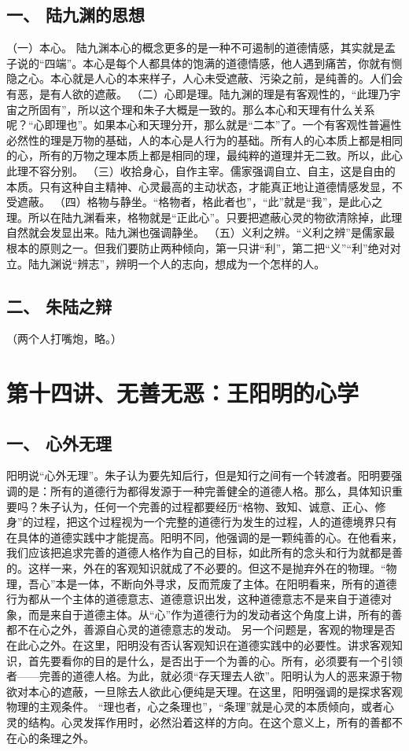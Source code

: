 \documentclass{article}
\begin{document}
\subsection{一、	陆九渊的思想}
（一）本心。 陆九渊本心的概念更多的是一种不可遏制的道德情感，其实就是孟子说的“四端”。本心是每个人都具体的饱满的道德情感，他人遇到痛苦，你就有恻隐之心。本心就是人心的本来样子，人心未受遮蔽、污染之前，是纯善的。人们会有恶，是有人欲的遮蔽。
（二）心即是理。陆九渊的理是有客观性的，“此理乃宇宙之所固有”，所以这个理和朱子大概是一致的。那么本心和天理有什么关系呢？“心即理也”。如果本心和天理分开，那么就是“二本”了。一个有客观性普遍性必然性的理是万物的基础，人的本心是人行为的基础。所有人的心本质上都是相同的心，所有的万物之理本质上都是相同的理，最纯粹的道理并无二致。所以，此心此理不容分别。
（三）收拾身心，自作主宰。儒家强调自立、自主，这是自由的本质。只有这种自主精神、心灵最高的主动状态，才能真正地让道德情感发显，不受遮蔽。
（四）格物与静坐。“格物者，格此者也”，“此”就是“我”，是此心之理。所以在陆九渊看来，格物就是“正此心”。只要把遮蔽心灵的物欲清除掉，此理自然就会发显出来。陆九渊也强调静坐。
（五）义利之辨。“义利之辨”是儒家最根本的原则之一。但我们要防止两种倾向，第一只讲“利”，第二把“义”“利”绝对对立。陆九渊说“辨志”，辨明一个人的志向，想成为一个怎样的人。
\subsection{二、	朱陆之辩}
（两个人打嘴炮，略。）

\section{第十四讲、无善无恶：王阳明的心学}
\subsection{一、	心外无理}
阳明说“心外无理”。朱子认为要先知后行，但是知行之间有一个转渡者。阳明要强调的是：所有的道德行为都得发源于一种完善健全的道德人格。那么，具体知识重要吗？朱子认为，任何一个完善的过程都要经历“格物、致知、诚意、正心、修身”的过程，把这个过程视为一个完整的道德行为发生的过程，人的道德境界只有在具体的道德实践中才能提高。阳明不同，他强调的是一颗纯善的心。在他看来，我们应该把追求完善的道德人格作为自己的目标，如此所有的念头和行为就都是善的。这样一来，外在的客观知识就成了不必要的。但这不是抛弃外在的物理。“物理，吾心”本是一体，不断向外寻求，反而荒废了主体。在阳明看来，所有的道德行为都从一个主体的道德意志、道德意识出发，这种道德意志不是来自于道德对象，而是来自于道德主体。从“心”作为道德行为的发动者这个角度上讲，所有的善都不在心之外，善源自心灵的道德意志的发动。
另一个问题是，客观的物理是否在此心之外。在这里，阳明没有否认客观知识在道德实践中的必要性。讲求客观知识，首先要看你的目的是什么，是否出于一个为善的心。所有，必须要有一个引领者——完善的道德人格。为此，就必须“存天理去人欲”。阳明认为人的恶来源于物欲对本心的遮蔽，一旦除去人欲此心便纯是天理。在这里，阳明强调的是探求客观物理的主观条件。
“理也者，心之条理也”，“条理”就是心灵的本质倾向，或者心灵的结构。心灵发挥作用时，必然沿着这样的方向。在这个意义上，所有的善都不在心的条理之外。
\end{document}
